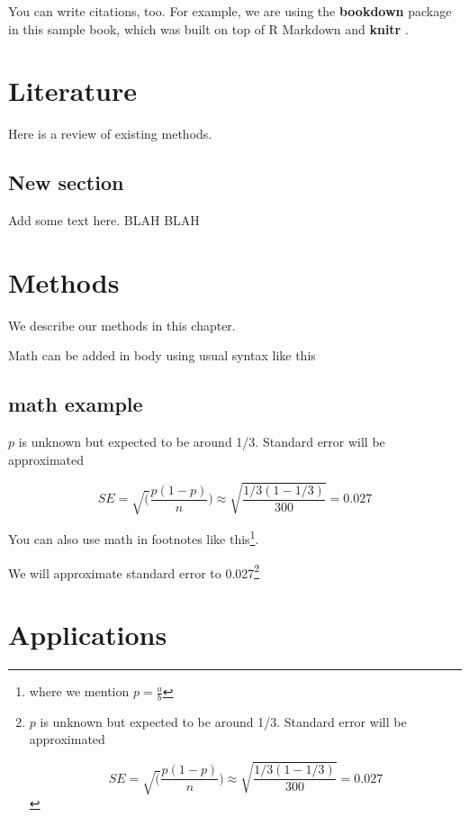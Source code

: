 \documentclass[
]{book}
\begin{document}
You can write citations, too. For example, we are using the \textbf{bookdown} package \citep{R-bookdown} in this sample book, which was built on top of R Markdown and \textbf{knitr} \citep{xie2015}.

\hypertarget{literature}{%
\chapter{Literature}\label{literature}}

Here is a review of existing methods.

\hypertarget{new-section}{%
\section{New section}\label{new-section}}

Add some text here. BLAH BLAH

\hypertarget{methods}{%
\chapter{Methods}\label{methods}}

We describe our methods in this chapter.

Math can be added in body using usual syntax like this

\hypertarget{math-example}{%
\section{math example}\label{math-example}}

\(p\) is unknown but expected to be around 1/3. Standard error will be approximated

\[
SE = \sqrt(\frac{p(1-p)}{n}) \approx \sqrt{\frac{1/3 (1 - 1/3)} {300}} = 0.027
\]

You can also use math in footnotes like this\footnote{where we mention \(p = \frac{a}{b}\)}.

We will approximate standard error to 0.027\footnote{\(p\) is unknown but expected to be around 1/3. Standard error will be approximated

  \[
  SE = \sqrt(\frac{p(1-p)}{n}) \approx \sqrt{\frac{1/3 (1 - 1/3)} {300}} = 0.027
  \]}

\hypertarget{applications}{%
\chapter{Applications}\label{applications}}
\end{document}
